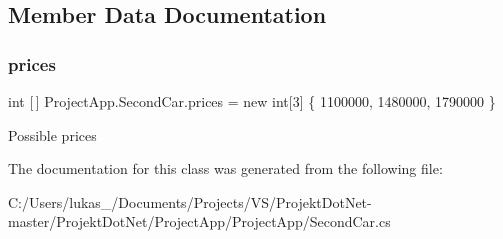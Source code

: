 \subsection{Member Data Documentation}
\mbox{\label{class_project_app_1_1_second_car_abc3f9ef0f6b46c69397f59934166eab7}} 
\subsubsection{\texorpdfstring{prices}{prices}}
{\footnotesize\ttfamily int \mbox{[}$\,$\mbox{]} Project\+App.\+Second\+Car.\+prices = new int\mbox{[}3\mbox{]} \{ 1100000, 1480000, 1790000 \}}



Possible prices 



The documentation for this class was generated from the following file\+:\begin{DoxyCompactItemize}
\item 
C\+:/\+Users/lukas\+\_/\+Documents/\+Projects/\+V\+S/\+Projekt\+Dot\+Net-\/master/\+Projekt\+Dot\+Net/\+Project\+App/\+Project\+App/Second\+Car.\+cs\end{DoxyCompactItemize}
